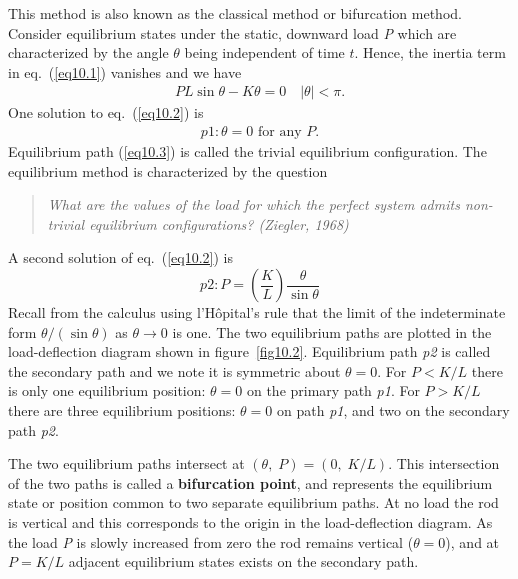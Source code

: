 \documentclass{AeroStructure-ERJohnson}
\begin{document}
This method is also known as the classical method or bifurcation method. Consider equilibrium states under the static, downward load \textit{P} which are characterized by the angle $\theta$ being independent of time $t$. Hence, the inertia term in eq.~(\ref{eq10.1}) vanishes and we have
\begin{align}\label{eq10.2}
P L \sin \theta-K \theta=0 \quad|\theta|<\pi.
\end{align}
One solution to eq.~(\ref{eq10.2}) is
\begin{align}\label{eq10.3}
p 1: \theta=0 \text { for any } {P}.
\end{align}
Equilibrium path (\ref{eq10.3}) is called the trivial equilibrium configuration. The equilibrium method is characterized by the question
\begin{quote}
\textit{What are the values of the load for which the perfect system admits non-trivial equilibrium configurations? (Ziegler, 1968)}
\end{quote}

A second solution of eq.~(\ref{eq10.2}) is
\begin{equation}\label{eq10.4}
p 2: P=\left(\frac{K}{L}\right) \frac{\theta}{\sin \theta}
\end{equation}
Recall from the calculus using l'H\^{o}pital's rule that the limit of the indeterminate form $\theta /(\sin \theta)$ as $\theta \rightarrow 0$ is one. The two equilibrium paths are plotted in the load-deflection diagram shown in figure~\ref{fig10.2}. Equilibrium path \textit{p2} is called the secondary path and we note it is symmetric about $\theta = 0$. For $P<K / L$ there is only one equilibrium position: $\theta=0$ on the primary path \textit{p1}. For $P>K / L$ there are three equilibrium positions: $\theta=0$ on path \textit{p1}, and two on the secondary path \textit{p2}.

The two equilibrium paths intersect at $(\theta,\;\textit{P}) = (0,\;\textit{K/L})$. This intersection of the two paths is called a \textbf{bifurcation point}, and represents the equilibrium state or position common to two separate equilibrium paths. At no load the rod is vertical and this corresponds to the origin in the load-deflection diagram. As the load \textit{P} is slowly increased from zero the rod remains vertical ($\theta = 0$), and at ${P = K/L}$ adjacent equilibrium states exists on the secondary path\vspace*{10pt}.
\end{document}
